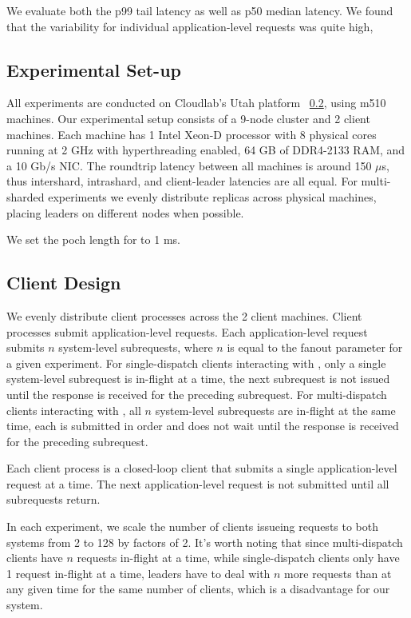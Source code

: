 We evaluate both the p99 tail latency as well as p50 median latency. We found that the variability for individual application-level requests was quite high,

\subsection{Experimental Set-up}
All experiments are conducted on Cloudlab's Utah platform ~\ref{}, using m510 machines. 
Our experimental setup consists of a 9-node cluster and 2 client machines. 
Each machine has 1 Intel Xeon-D processor with 8 physical cores running at 2 GHz with hyperthreading enabled, 64 GB of DDR4-2133 RAM, and a 10 Gb/s NIC. 
The roundtrip latency between all machines is around 150 $\mu$s, thus intershard, intrashard, and client-leader latencies are all equal. 
For multi-sharded experiments we evenly distribute replicas across physical machines, placing leaders on different nodes when possible. %

We set the poch length for \system to 1 ms.

\subsection{Client Design}
We evenly distribute client processes across the 2 client machines. Client processes submit application-level requests. Each application-level request submits $n$ system-level subrequests, where $n$ is equal to the fanout parameter for a given experiment. For single-dispatch clients interacting with \mpaxos, only a single system-level subrequest is in-flight at a time, the next subrequest is not issued until the response is received for the preceding subrequest. For multi-dispatch clients interacting with \protocol, all $n$ system-level subrequests are in-flight at the same time, each is submitted in order and does not wait until the response is received for the preceding subrequest.

Each client process is a closed-loop client that submits a single application-level request at a time. The next application-level request is not submitted until all subrequests return. 

In each experiment, we scale the number of clients issueing requests to both systems from 2 to 128 by factors of 2. It's worth noting that since multi-dispatch clients have $n$ requests in-flight at a time, while single-dispatch clients only have 1 request in-flight at a time, \protocol leaders have to deal with $n$ more requests than \mpaxos at any given time for the same number of clients, which is a disadvantage for our system.

